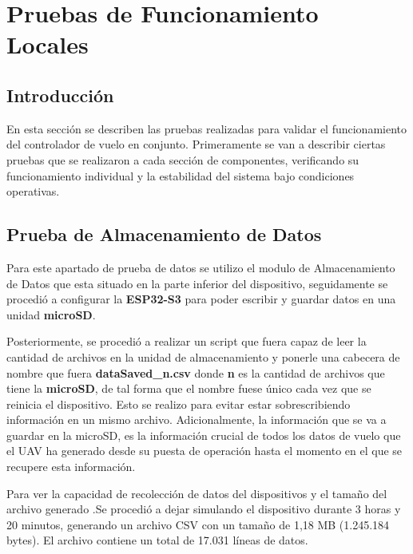 \section{Pruebas de Funcionamiento Locales}


    \subsection{Introducción}\vspace{5 px}

        En esta sección se describen las pruebas realizadas para validar el funcionamiento del controlador de vuelo en conjunto. Primeramente se van a describir ciertas pruebas que se realizaron a cada sección de componentes, verificando su funcionamiento individual y la estabilidad del sistema bajo condiciones operativas.\vspace{5 px}

    \subsection{Prueba de Almacenamiento de Datos}
        \vspace{5 px}

        Para este apartado de prueba de datos se utilizo el modulo de Almacenamiento de Datos que esta situado en la parte inferior del dispositivo, seguidamente se procedió a configurar la \textbf{ESP32-S3} para poder escribir y guardar datos en una unidad \textbf{microSD}. 

        \vspace{5 px}

        Posteriormente, se procedió a realizar un script que fuera capaz de leer la cantidad de archivos en la unidad de almacenamiento y ponerle una cabecera de nombre que fuera \textbf{dataSaved\_n.csv} donde \textbf{n} es la cantidad de archivos que tiene la \textbf{microSD}, de tal forma que el nombre fuese único cada vez que se reinicia el dispositivo. Esto se realizo para evitar estar sobrescribiendo información en un mismo archivo. Adicionalmente, la información que se va a guardar en la microSD, es la información crucial de todos los datos de vuelo que el UAV ha generado desde su puesta de operación hasta el momento en el que se recupere esta información. \\
        \vspace{10 px}

        Para ver la capacidad de recolección de datos del dispositivos y el tamaño del archivo generado .Se procedió a dejar simulando el dispositivo durante 3  horas y 20 minutos, generando un archivo CSV con un tamaño de 1,18 MB (1.245.184 bytes). El archivo contiene un total de 17.031 líneas de datos.\vspace{5 px}


